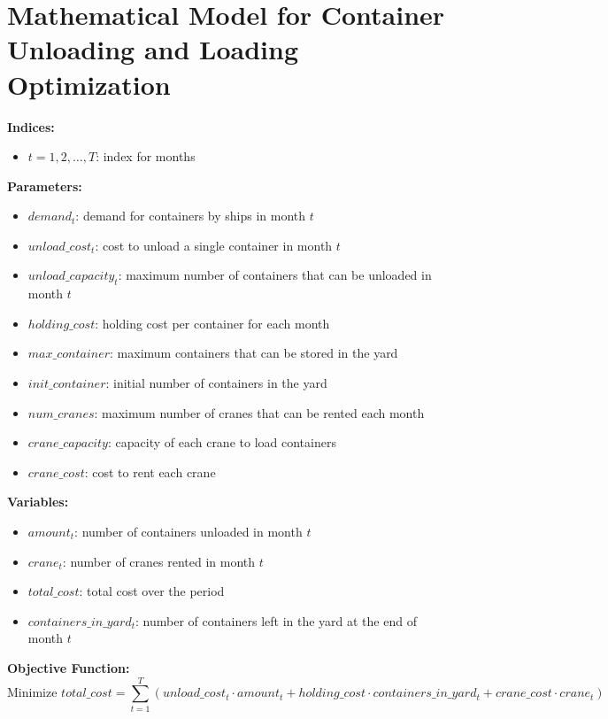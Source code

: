 \documentclass{article}
\begin{document}
\section*{Mathematical Model for Container Unloading and Loading Optimization}

\textbf{Indices:}
\begin{itemize}
    \item $t = 1, 2, \ldots, T$: index for months
\end{itemize}

\textbf{Parameters:}
\begin{itemize}
    \item $demand_t$: demand for containers by ships in month $t$
    \item $unload\_cost_t$: cost to unload a single container in month $t$
    \item $unload\_capacity_t$: maximum number of containers that can be unloaded in month $t$
    \item $holding\_cost$: holding cost per container for each month
    \item $max\_container$: maximum containers that can be stored in the yard
    \item $init\_container$: initial number of containers in the yard
    \item $num\_cranes$: maximum number of cranes that can be rented each month
    \item $crane\_capacity$: capacity of each crane to load containers
    \item $crane\_cost$: cost to rent each crane
\end{itemize}

\textbf{Variables:}
\begin{itemize}
    \item $amount_t$: number of containers unloaded in month $t$
    \item $crane_t$: number of cranes rented in month $t$
    \item $total\_cost$: total cost over the period
    \item $containers\_in\_yard_t$: number of containers left in the yard at the end of month $t$
\end{itemize}

\textbf{Objective Function:}
\[
\text{Minimize } total\_cost = \sum_{t=1}^{T} (unload\_cost_t \cdot amount_t + holding\_cost \cdot containers\_in\_yard_t + crane\_cost \cdot crane_t)
\]
\end{document}
